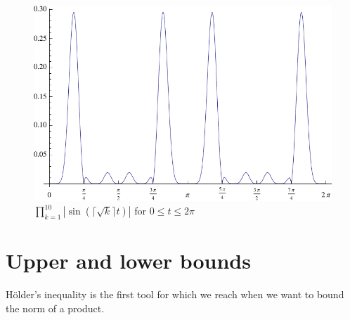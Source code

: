 \documentclass{amsart}
\begin{document}
\begin{center}
\begin{figure}
\includegraphics[scale=0.95]{sqrt10}
\caption{$\prod_{k=1}^{10} |\sin(\lceil \sqrt{k} \rceil t)|$ for $0 \leq t \leq 2\pi$}
\label{sqrt10}
\end{figure}
\end{center}



\section{Upper and lower bounds}
\label{bounds}
H\"older's inequality is the first tool for which we reach when we want to bound the norm of a product.
\end{document}
